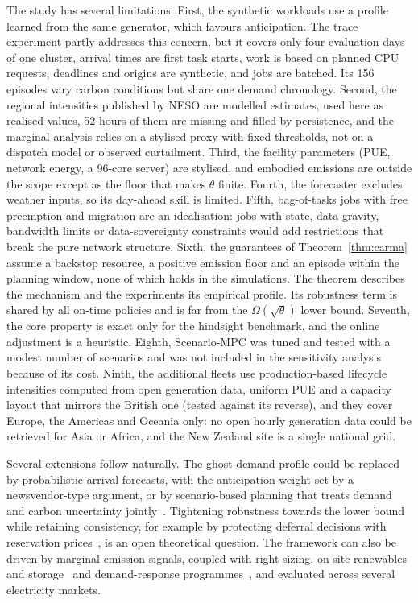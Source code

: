 The study has several limitations. First, the synthetic workloads use a profile learned from the same generator, which favours anticipation. The trace experiment partly addresses this concern, but it covers only four evaluation days of one cluster, arrival times are first task starts, work is based on planned CPU requests, deadlines and origins are synthetic, and jobs are batched. Its 156 episodes vary carbon conditions but share one demand chronology. Second, the regional intensities published by NESO are modelled estimates, used here as realised values, 52 hours of them are missing and filled by persistence, and the marginal analysis relies on a stylised proxy with fixed thresholds, not on a dispatch model or observed curtailment. Third, the facility parameters (PUE, network energy, a 96-core server) are stylised, and embodied emissions are outside the scope except as the floor that makes $\theta$ finite. Fourth, the forecaster excludes weather inputs, so its day-ahead skill is limited. Fifth, bag-of-tasks jobs with free preemption and migration are an idealisation: jobs with state, data gravity, bandwidth limits or data-sovereignty constraints would add restrictions that break the pure network structure. Sixth, the guarantees of Theorem~\ref{thm:carma} assume a backstop resource, a positive emission floor and an episode within the planning window, none of which holds in the simulations. The theorem describes the mechanism and the experiments its empirical profile. Its robustness term is shared by all on-time policies and is far from the $\Omega(\sqrt\theta)$ lower bound. Seventh, the core property is exact only for the hindsight benchmark, and the online adjustment is a heuristic. Eighth, Scenario-MPC was tuned and tested with a modest number of scenarios and was not included in the sensitivity analysis because of its cost. Ninth, the additional fleets use production-based lifecycle intensities computed from open generation data, uniform PUE and a capacity layout that mirrors the British one (tested against its reverse), and they cover Europe, the Americas and Oceania only: no open hourly generation data could be retrieved for Asia or Africa, and the New Zealand site is a single national grid.

Several extensions follow naturally. The ghost-demand profile could be replaced by probabilistic arrival forecasts, with the anticipation weight set by a newsvendor-type argument, or by scenario-based planning that treats demand and carbon uncertainty jointly~\cite{bertsimas2004price}. Tightening robustness towards the lower bound while retaining consistency, for example by protecting deferral decisions with reservation prices~\cite{elyaniv2001optimal,lechowicz2025learning}, is an open theoretical question. The framework can also be driven by marginal emission signals, coupled with right-sizing, on-site renewables and storage~\cite{souza2023ecovisor,acun2023carbon} and demand-response programmes~\cite{wierman2014opportunities}, and evaluated across several electricity markets.

